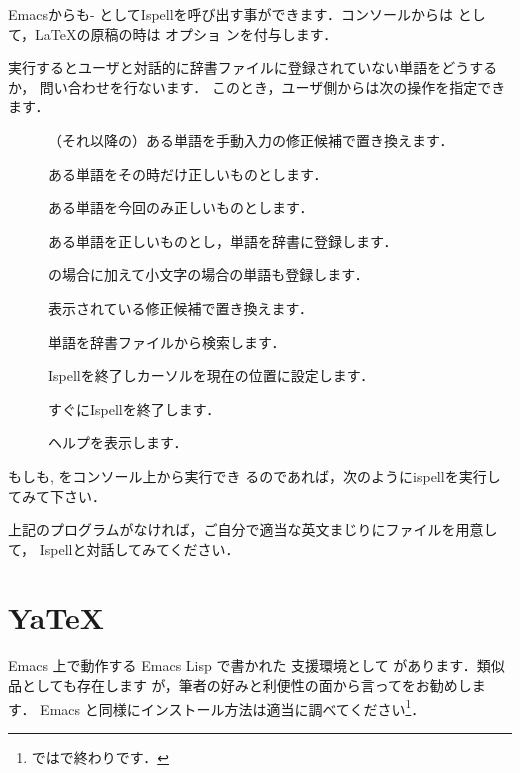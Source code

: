 Emacsからも-  
としてIspellを呼び出す事ができます．コンソールからは
として，\LaTeX の原稿の時は  オプショ
ンを付与します．

実行するとユーザと対話的に辞書ファイルに登録されていない単語をどうするか，
問い合わせを行ないます．
このとき，ユーザ側からは次の操作を指定できます．

\begin{description}
 \item[] （それ以降の）ある単語を手動入力の修正候補で置き換えます．
 \item[] ある単語をその時だけ正しいものとします．
 \item[] ある単語を今回のみ正しいものとします．
 \item[] ある単語を正しいものとし，単語を辞書に登録します．
 \item[] の場合に加えて小文字の場合の単語も登録します．
 \item[] 表示されている修正候補で置き換えます．
 \item[] 単語を辞書ファイルから検索します．
 \item[] Ispellを終了しカーソルを現在の位置に設定します．
 \item[] すぐにIspellを終了します．
 \item[] ヘルプを表示します．
\end{description}

\begin{Prob}
 もしも,  をコンソール上から実行でき
 るのであれば，次のようにispellを実行してみて下さい．
\begin{InTerm}
\end{InTerm}
上記のプログラムがなければ，ご自分で適当な英文まじりにファイルを用意して，
Ispellと対話してみてください．
\end{Prob}

\section{Ya\TeX}

Emacs 上で動作する Emacs Lisp で書かれた \laTEX 支援環境として
 があります．類似品としても存在します
が，筆者の好みと利便性の面から言ってをお勧めします．
Emacs と同様にインストール方法は適当に調べてください\footnote{%
ではで終わりです．}．

